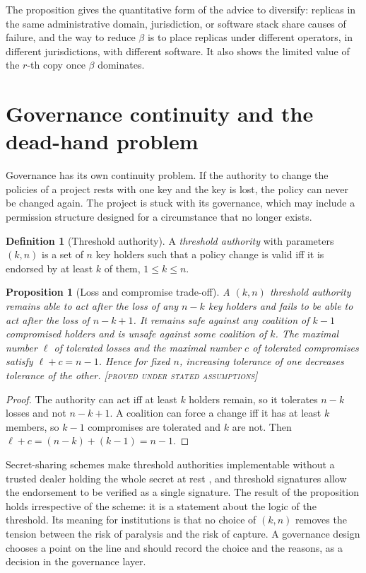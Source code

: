 \documentclass[11pt,twoside,openright]{book}
\theoremstyle{plain}
\newtheorem{proposition}[theorem]{Proposition}
\theoremstyle{definition}
\newtheorem{definition}[theorem]{Definition}
\theoremstyle{remark}
\newcommand{\Proved}{\textup{\textsc{[proved under stated assumptions]}}}
\begin{document}
The proposition gives the quantitative form of the advice to diversify: replicas in the same administrative domain, jurisdiction, or software stack share causes of failure, and the way to reduce $\beta$ is to place replicas under different operators, in different jurisdictions, with different software. It also shows the limited value of the $r$-th copy once $\beta$ dominates.

\section{Governance continuity and the dead-hand problem}

Governance has its own continuity problem. If the authority to change the policies of a project rests with one key and the key is lost, the policy can never be changed again. The project is stuck with its governance, which may include a permission structure designed for a circumstance that no longer exists.

\begin{definition}[Threshold authority]\label{def:threshold}
A \emph{threshold authority} with parameters $(k,n)$ is a set of $n$ key holders such that a policy change is valid iff it is endorsed by at least $k$ of them, $1\le k\le n$.
\end{definition}

\begin{proposition}[Loss and compromise trade-off]\label{prop:threshold}
A $(k,n)$ threshold authority remains able to act after the loss of any $n-k$ key holders and fails to be able to act after the loss of $n-k+1$. It remains safe against any coalition of $k-1$ compromised holders and is unsafe against some coalition of $k$. The maximal number $\ell$ of tolerated losses and the maximal number $c$ of tolerated compromises satisfy $\ell+c=n-1$. Hence for fixed $n$, increasing tolerance of one decreases tolerance of the other.
\Proved{}
\end{proposition}

\begin{proof}
The authority can act iff at least $k$ holders remain, so it tolerates $n-k$ losses and not $n-k+1$. A coalition can force a change iff it has at least $k$ members, so $k-1$ compromises are tolerated and $k$ are not. Then $\ell+c=(n-k)+(k-1)=n-1$.
\end{proof}

Secret-sharing schemes make threshold authorities implementable without a trusted dealer holding the whole secret at rest \cite{shamir1979}, and threshold signatures allow the endorsement to be verified as a single signature. The result of the proposition holds irrespective of the scheme: it is a statement about the logic of the threshold. Its meaning for institutions is that no choice of $(k,n)$ removes the tension between the risk of paralysis and the risk of capture. A governance design chooses a point on the line and should record the choice and the reasons, as a decision in the governance layer.
\end{document}
